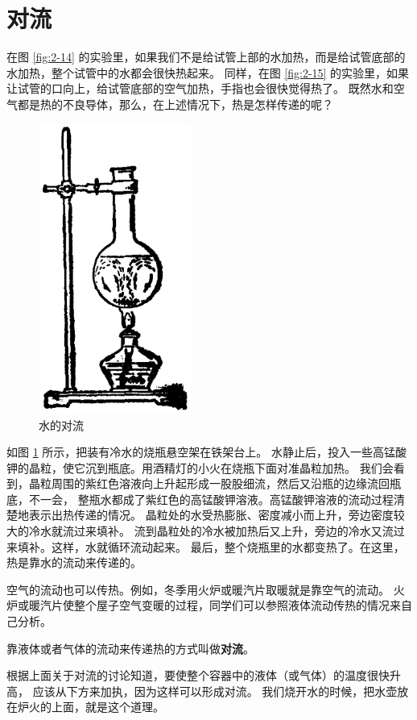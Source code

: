 \section{对流}\label{sec:2-6}

在图 \ref{fig:2-14} 的实验里，如果我们不是给试管上部的水加热，而是给试管底部的水加热，整个试管中的水都会很快热起来。
同样，在图 \ref{fig:2-15} 的实验里，如果让试管的口向上，给试管底部的空气加热，手指也会很快觉得热了。
既然水和空气都是热的不良导体，那么，在上述情况下，热是怎样传递的呢？

\begin{figure}
    \centering
    \includegraphics[width=5cm]{../pic/czwl2-ch2-16}
    \caption{水的对流}\label{fig:2-16}
\end{figure}


如图 \ref{fig:2-16} 所示，把装有冷水的烧瓶悬空架在铁架台上。
水静止后，投入一些高锰酸钾的晶粒，使它沉到瓶底。用酒精灯的小火在烧瓶下面对准晶粒加热。
我们会看到，晶粒周围的紫红色溶液向上升起形成一股股细流，然后又沿瓶的边缘流回瓶底，不一会，
整瓶水都成了紫红色的高锰酸钾溶液。高锰酸钾溶液的流动过程清楚地表示出热传递的情况。
晶粒处的水受热膨胀、密度减小而上升，旁边密度较大的冷水就流过来填补。
流到晶粒处的冷水被加热后又上升，旁边的冷水又流过来填补。这样，水就循环流动起来。
最后，整个烧瓶里的水都变热了。在这里，热是靠水的流动来传递的。

空气的流动也可以传热。例如，冬季用火炉或暖汽片取暖就是靠空气的流动。
火炉或暖汽片使整个屋子空气变暖的过程，同学们可以参照液体流动传热的情况来自己分析。

靠液体或者气体的流动来传递热的方式叫做\textbf{对流}。

根据上面关于对流的讨论知道，要使整个容器中的液体（或气体）的温度很快升高，
应该从下方来加执，因为这样可以形成对流。
我们烧开水的时候，把水壶放在炉火的上面，就是这个道理。

